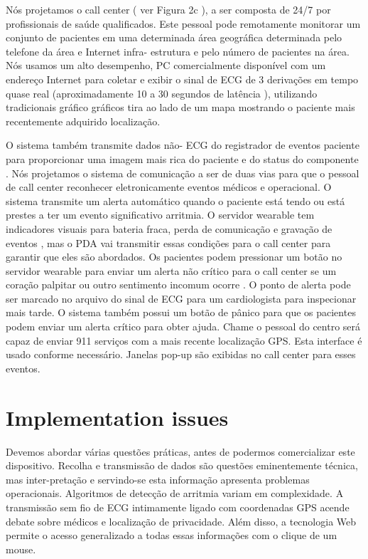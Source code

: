 \documentclass[12pt]{article} %
\begin{document}
Nós projetamos o call center ( ver Figura 2c ), a ser composta de 24/7 por profissionais de saúde qualificados. Este pessoal pode remotamente monitorar um conjunto de pacientes em uma determinada área geográfica determinada pelo telefone da área e Internet infra- estrutura e pelo número de pacientes na área. Nós usamos um alto desempenho, PC comercialmente disponível com um endereço Internet para coletar e exibir o sinal de ECG de 3 derivações em tempo quase real (aproximadamente 10 a 30 segundos de latência ), utilizando tradicionais gráfico gráficos tira ao lado de um mapa mostrando o paciente mais recentemente adquirido localização.

O sistema também transmite dados não- ECG do registrador de eventos paciente para proporcionar uma imagem mais rica do paciente e do status do componente . Nós projetamos o sistema de comunicação a ser de duas vias para que o pessoal de call center reconhecer eletronicamente eventos médicos e operacional. O sistema transmite um alerta automático quando o paciente está tendo ou está prestes a ter um evento significativo arritmia. O servidor wearable tem indicadores visuais para bateria fraca, perda de comunicação e gravação de eventos , mas o PDA vai transmitir essas condições para o call center para garantir que eles são abordados. Os pacientes podem pressionar um botão no servidor wearable para enviar um alerta não crítico para o call center se um coração palpitar ou outro sentimento incomum ocorre . O ponto de alerta pode ser marcado no arquivo do sinal de ECG para um cardiologista para inspecionar mais tarde. O sistema também possui um botão de pânico para que os pacientes podem enviar um alerta crítico para obter ajuda. Chame o pessoal do centro será capaz de enviar 911 serviços com a mais recente localização GPS. Esta interface é usado conforme necessário. Janelas pop-up são exibidas no call center para esses eventos.


\section{Implementation issues}

Devemos abordar várias questões práticas, antes de podermos comercializar este dispositivo. Recolha e transmissão de dados são questões eminentemente técnica, mas inter-pretação e servindo-se esta informação apresenta problemas operacionais. Algoritmos de detecção de arritmia variam em complexidade. A transmissão sem fio de ECG intimamente ligado com coordenadas GPS acende debate sobre médicos e localização de privacidade. Além disso, a tecnologia Web permite o acesso generalizado a todas essas informações com o clique de um mouse.
\end{document}
